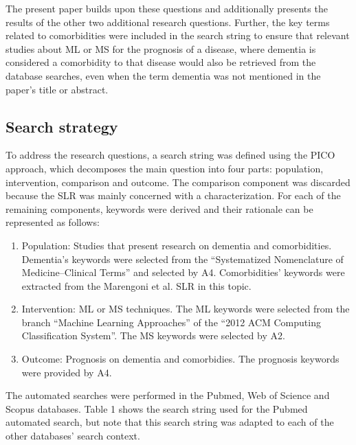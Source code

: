 \documentclass[12pt]{article}
\begin{document}
The present paper builds upon these questions and additionally presents the results of the other two additional research questions. Further, the key terms related to comorbidities were included in the search string to ensure that relevant studies about ML or MS for the prognosis of a disease, where dementia is considered a comorbidity to that disease would also be retrieved from the database searches, even when the term dementia was not mentioned in the paper’s title or abstract.

\subsection{Search strategy}
To address the research questions, a search string was defined using the PICO approach, which decomposes the main question into four parts: population, intervention, comparison and outcome. The comparison component was discarded because the SLR was mainly concerned with a characterization. For each of the remaining components, keywords were derived and their rationale can be represented as follows:
\begin{enumerate}
	\item Population: Studies that present research on dementia and comorbidities. Dementia’s keywords were selected from the “Systematized Nomenclature of Medicine–Clinical Terms” and selected by A4. Comorbidities’ keywords were extracted from the Marengoni et al. SLR in this topic.
	\item Intervention: ML or MS techniques. The ML keywords were selected from the branch “Machine Learning Approaches” of the “2012 ACM Computing Classification System”. The MS keywords were selected by A2.
	\item Outcome: Prognosis on dementia and comorbidies. The prognosis keywords were provided
by A4.
\end{enumerate}

The automated searches were performed in the Pubmed, Web of Science and Scopus databases. Table 1 shows the search string used for the Pubmed automated search, but note that this search string was adapted to each of the other databases’ search context.
\end{document}
